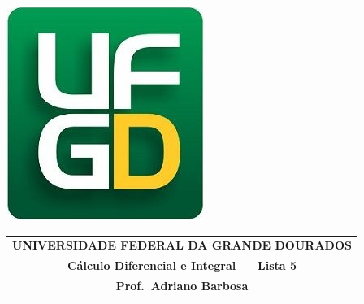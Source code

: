 \documentclass[a4paper,5pt]{amsbook}
\begin{document}
\thispagestyle{empty}
\pagestyle{empty}
\begin{minipage}[h]{0.14\textwidth}
	\includegraphics[scale=0.24]{../../ufgd.png}
\end{minipage}
\begin{minipage}[h]{\textwidth}
\begin{tabular}{c}
{{\bf UNIVERSIDADE FEDERAL DA GRANDE DOURADOS}}\\
{{\bf C\'alculo Diferencial e Integral --- Lista 5}}\\
{{\bf Prof.\ Adriano Barbosa}}\\
\end{tabular}
\vspace{-0.45cm}
%
\end{minipage}

\end{document}
